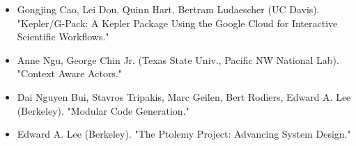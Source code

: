 \begin{itemize}
                   \cite{RavindranParthasarathy11_DesignAnalysisImplementationOfStaticDataflowModels}
                 \item Gongjing Cao, Lei Dou, Quinn Hart, Bertram
                   Ludaescher (UC Davis). "Kepler/G-Pack: A Kepler Package Using the Google Cloud
                   for Interactive Scientific Workflows."
                   \cite{CaoDouHartLudaescher11_KeplerGPackKeplerPackageUsingGoogleCloudForInteractive}
                 \item Anne Ngu, George Chin Jr. (Texas State Univ., Pacific NW National Lab). "Context Aware Actors." 
                   \cite{NguChinJr11_ContextAwareActors}
                 \item Dai Nguyen Bui, Stavros Tripakis, Marc Geilen, Bert Rodiers,
                   Edward A. Lee (Berkeley). "Modular Code Generation."
                   \cite{BuiTripakisGeilenRodiersLee11_ModularCodeGeneration}
                 \item Edward A. Lee (Berkeley). "The Ptolemy Project: Advancing System Design." 
                   \cite{Lee11_PtolemyProjectAdvancingSystemDesign}
                 \end{itemize}

